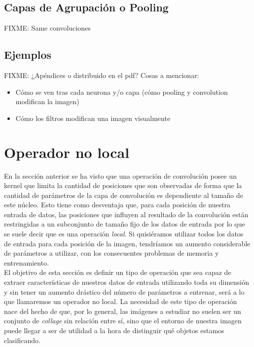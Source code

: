 \section{Capas de Agrupación o Pooling}

FIXME: Same convoluciones

\section{Ejemplos}

FIXME: ¿Apéndices o distribuido en el pdf? Cosas a mencionar:

\begin{itemize}
\item Cómo se ven tras cada neurona y/o capa (cómo pooling y convolution modifican la imagen)
\item Cómo los filtros modifican una imagen visualmente
\end{itemize}

\chapter{Operador no local}\label{def:non-local}
En la sección anterior se ha visto que una operación de convolución posee un kernel que limita la cantidad de posiciones que son observadas de forma que la cantidad de parámetros de la capa de convolución es dependiente al tamaño de este núcleo. Esto tiene como desventaja que, para cada posición de nuestra entrada de datos, las posiciones que influyen al resultado de la convolución están restringidas a un subconjunto de tamaño fijo de los datos de entrada por lo que se suele decir que es una operación \emph{local}. Si quisiéramos utilizar todos los datos de entrada para cada posición de la imagen, tendríamos un aumento considerable de parámetros a utilizar, con los consecuentes problemas de memoria y entrenamiento.\\

El objetivo de esta sección es definir un tipo de operación que sea capaz de extraer características de nuestros datos de entrada utilizando toda su dimensión y sin tener un aumento drástico del número de parámetros a entrenar, será a lo que llamaremos un operador no local. La necesidad de este tipo de operación nace del hecho de que, por lo general, las imágenes a estudiar no suelen ser un conjunto de \emph{collage} sin relación entre sí, sino que el entorno de nuestra imagen puede llegar a ser de utilidad a la hora de distinguir qué objetos estamos clasificando.\\

